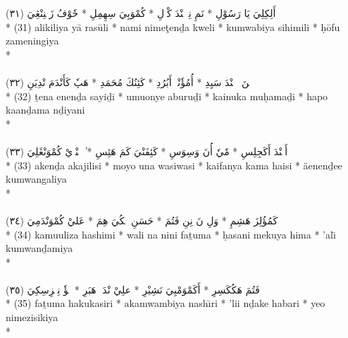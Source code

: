 \documentclass[a4paper, 12pt]{report}
\begin{document}
\begin{center}
\textarabic{(٣١) \textcolor{mygreen}{أَلِكِلِيَ يَا رَسُوْلِ  * نَمِ نِمٖٹٖنْدَ كْوٖلِ  * كُمْوَبِيَ سِهِمِلِ  * حٗوْفُ زَمٖنِنْڠِيَ }} \\* 
(31) alikiliya yā rasūli  * nami nimeţenḏa kweli  * kumwabiya sihimili  * ḥōfu zameningiya  \\* 
 \\ 
\\[8mm] 

\textarabic{(٣٢) \textcolor{mygreen}{تٖنَ إٖنٖنْدَ سَيِدِ  * أُمُؤٗنْيٖ أَبُرُدِ  * كَئِنُكَ مُحَمَدِ  * هَپٗ كَأَنْدَمَ نْدِيَنِ }} \\* 
(32) ṯena enenḏa sayiḏi  * umuonye aburuḏi  * kainuka muḥamaḏi  * hapo kaanḏama nḏiyani  \\* 
 \\ 
\\[8mm] 

\textarabic{(٣٣) \textcolor{mygreen}{أَكٖنْدَ أَكَجِلِسِ  * مٗيٗ أُنَ وَسِوَسِ  * كَئِفَنْيَ كَمَ هَئِسِ  * ٰإٖنٖنْدٖيْ كُمْوَنْڠَلِيَ }} \\* 
(33) akenḏa akajilisi  * moyo una wasiwasi  * kaifanya kama haisi  * äenenḏee kumwangaliya  \\* 
 \\ 
\\[8mm] 

\textarabic{(٣٤) \textcolor{mygreen}{كَمُؤُلِزَ هَشِمِ  * وَلِ نَ نِنِ فَتُمَ  * حَسَنِ مٖكُيَ هِمَ  * عَليْ كُمْوَنْدَمِيَ }} \\* 
(34) kamuuliza hashimi  * wali na nini faṯuma  * ḥasani mekuya hima  * 'alı̄ kumwanḏamiya  \\* 
 \\ 
\\[8mm] 

\textarabic{(٣٥) \textcolor{mygreen}{فَتُمَ هَكُكَسِرِ  * أَكَمْوَمْبِيَ نَشِيْرِ  * علِيْ نْدَكٖ هَبَرِ  * يٖؤٗ نِمٖزِسِكِيَ }} \\* 
(35) faṯuma hakukasiri  * akamwambiya nashı̄ri  * 'lii nḏake habari  * yeo nimezisikiya  \\* 
 \\ 
\\[8mm] 


\end{center}
\end{document}
